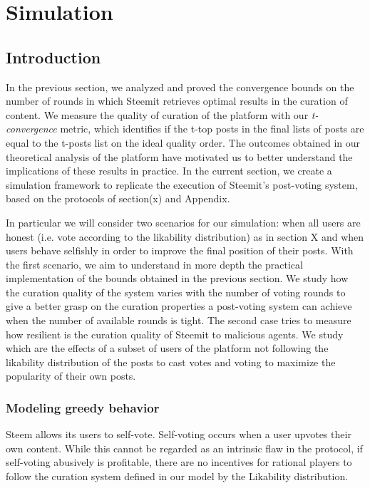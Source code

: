 
\section{Simulation}

\subsection{Introduction}

In the previous section, we analyzed and proved the convergence bounds on the number of rounds in which Steemit retrieves optimal results in the curation of content.
We measure the quality of curation of the platform with our \textit{t-convergence} metric, which identifies if the t-top posts in the final lists of posts are equal to the t-posts list on the ideal quality order.
The outcomes obtained in our theoretical analysis of the platform have motivated us to better understand the implications of these results in practice. In the current section, we create a simulation framework to replicate the execution of Steemit's post-voting system, based on the protocols of section(x) and Appendix.

In particular we will consider two scenarios for our simulation: when all users are honest (i.e. vote according to the likability distribution) as in section X and when users behave selfishly in order to improve the final position of their posts.
With the first scenario, we aim to understand in more depth the practical implementation of the bounds obtained in the previous section. We study how the curation quality of the system varies with the number of voting rounds to give a better grasp on the curation properties a post-voting system can achieve when the number of available rounds is tight.
The second case tries to measure how resilient is the curation quality of Steemit to malicious agents. We study which are the effects of a subset of users of the platform not following the likability distribution of the posts to cast votes and voting to maximize the popularity of their own posts.

\subsubsection*{Modeling greedy behavior}

Steem allows its users to self-vote. 
Self-voting occurs when a user upvotes their own content. While this cannot be regarded as an intrinsic flaw in the protocol, if self-voting abusively is profitable, there are no incentives for rational players to follow the
curation system defined in our model by the Likability distribution.

